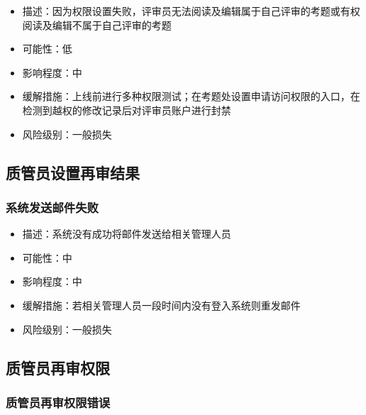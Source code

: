 \documentclass[hyperref, a4paper]{ctexart}
\providecommand{\tightlist}{%
  \setlength{\itemsep}{0pt}\setlength{\parskip}{0pt}}
\begin{document}
\begin{itemize}
\tightlist
\item
  描述：因为权限设置失败，评审员无法阅读及编辑属于自己评审的考题或有权阅读及编辑不属于自己评审的考题
\item
  可能性：低
\item
  影响程度：中
\item
  缓解措施：上线前进行多种权限测试；在考题处设置申请访问权限的入口，在检测到越权的修改记录后对评审员账户进行封禁
\item
  风险级别：一般损失
\end{itemize}

\hypertarget{ux8d28ux7ba1ux5458ux8bbeux7f6eux518dux5ba1ux7ed3ux679c}{%
\subsection{质管员设置再审结果}\label{ux8d28ux7ba1ux5458ux8bbeux7f6eux518dux5ba1ux7ed3ux679c}}

\hypertarget{ux7cfbux7edfux53d1ux9001ux90aeux4ef6ux5931ux8d25-3}{%
\subsubsection{系统发送邮件失败}\label{ux7cfbux7edfux53d1ux9001ux90aeux4ef6ux5931ux8d25-3}}

\begin{itemize}
\tightlist
\item
  描述：系统没有成功将邮件发送给相关管理人员
\item
  可能性：中
\item
  影响程度：中
\item
  缓解措施：若相关管理人员一段时间内没有登入系统则重发邮件
\item
  风险级别：一般损失
\end{itemize}

\hypertarget{ux8d28ux7ba1ux5458ux518dux5ba1ux6743ux9650-1}{%
\subsection{质管员再审权限}\label{ux8d28ux7ba1ux5458ux518dux5ba1ux6743ux9650-1}}

\hypertarget{ux8d28ux7ba1ux5458ux518dux5ba1ux6743ux9650ux9519ux8bef}{%
\subsubsection{质管员再审权限错误}\label{ux8d28ux7ba1ux5458ux518dux5ba1ux6743ux9650ux9519ux8bef}}
\end{document}
